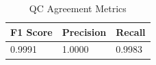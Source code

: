 \begin{table}[htbp]
\centering
\caption{QC Agreement Metrics}
\label{tab:qc}
\begin{tabular}{lll}
\toprule
F1 Score & Precision & Recall \\
\midrule
0.9991 & 1.0000 & 0.9983 \\
\bottomrule
\end{tabular}
\end{table}